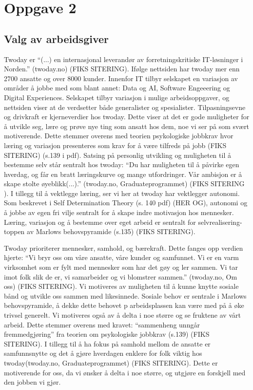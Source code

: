 \section{Oppgave 2}
\subsection{Valg av arbeidsgiver}
Twoday er \enquote{(...) en internasjonal leverandør av forretningskritiske IT-løsninger i Norden.}
(twoday.no) (FIKS SITERING). Ifølge nettsiden har twoday mer enn 2700 ansatte og over 8000 kunder. Innenfor IT
tilbyr selskapet en variasjon av områder å jobbe med som blant annet: Data og AI, Software Engeeering
og Digital Experiences. Selskapet tilbyr variasjon i mulige arbeidsoppgaver, og nettsiden viser at de
verdsetter både generalister og spesialister. Tilpasningsevne og drivkraft er kjerneverdier hos twoday.
Dette viser at det er gode muligheter for å utvikle seg, lære og prøve nye ting som ansatt hos dem,
noe vi ser på som svært motiverende. Dette stemmer overens med teorien psykologiske jobbkrav hvor
læring og variasjon presenteres som krav for å være tilfreds på jobb (FIKS SITERING) (s.139 i pdf). 
Satsing på personlig utvikling og muligheten til å bestemme selv står sentralt hos twoday: \enquote{Du har muligheten
til å påvirke egen hverdag, og får en bratt læringskurve og mange utfordringer. Vår ambisjon er å
skape stolte øyeblikk(...).} (twoday.no, Graduateprogrammet) (FIKS SITERING ). I tillegg til å vektlegge læring, ser
vi her at twoday har vektlegger autonomi. Som beskrevet i Self Determination Theory (s. 140 pdf) (HER OG),
autonomi og å jobbe av egen fri vilje sentralt for å skape indre motivasjon hos mennesker. Læring,
variasjon og å bestemme over eget arbeid er sentralt for selvrealisering-toppen av Marlows
behovspyramide (s.135) (FIKS SITERING).


Twoday prioriterer mennesker, samhold, og bærekraft. Dette fanges opp verdien hjerte:
“Vi bryr oss om våre ansatte, våre kunder og samfunnet. Vi er en varm virksomhet som er fylt
med mennesker som har det gøy og ler sammen. Vi tar imot folk slik de er, vi samarbeider og vi
blomstrer sammen.” (twoday.no, Om oss) (FIKS SITERING). Vi motiveres av muligheten til å kunne knytte sosiale bånd
og utvikle oss sammen med likesinnede. Sosiale behov er sentrale i Marlows behovspyramide, å dekke
dette behovet p arbeidsplassen kan være med på å øke trivsel generelt. Vi motiveres også av å delta
i noe større og se fruktene av vårt arbeid. Dette stemmer overens med kravet: “sammenheng unngår
fremmedgjøring” fra teorien om psykologiske jobbkrav (s.139) (FIKS SITERING). I tillegg til å ha fokus på samhold
mellom de ansatte er samfunnsnytte og det å gjøre hverdagen enklere for folk viktig hos
twoday(twoday.no, Graduateprogrammet) (FIKS SITERING). Dette er motiverende for oss, da vi ønsker å delta i noe
større, og utgjøre en forskjell med den jobben vi gjør.